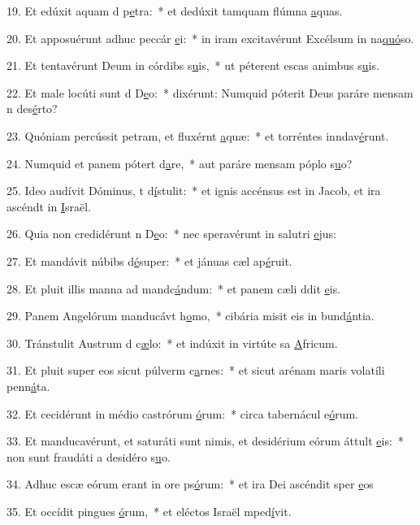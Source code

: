 19. Et edúxit aquam d p\uline{e}tra:~* et dedúxit tamquam flúmna \uline{a}quas.\par 
20. Et apposuérunt adhuc peccár \uline{e}i:~* in iram excitavérunt Excélsum in na\uline{quó}so.\par 
21. Et tentavérunt Deum in córdibs s\uline{u}is,~* ut péterent escas animbus s\uline{u}is.\par 
22. Et male locúti sunt d D\uline{e}o:~* dixérunt: Numquid póterit Deus paráre mensam n des\uline{é}rto?\par 
23. Quóniam percússit petram, et fluxérnt \uline{a}quæ:~* et torréntes inndav\uline{é}runt.\par 
24. Numquid et panem pótert d\uline{a}re,~* aut paráre mensam póplo s\uline{u}o?\par 
25. Ideo audívit Dóminus, t d\uline{í}stulit:~* et ignis accénsus est in Jacob, et ira ascéndt in \uline{I}sraël.\par 
26. Quia non credidérunt n D\uline{e}o:~* nec speravérunt in salutri \uline{e}jus:\par 
27. Et mandávit núbibs d\uline{é}super:~* et jánuas cæl ap\uline{é}ruit.\par 
28. Et pluit illis manna ad mandc\uline{á}ndum:~* et panem cæli ddit \uline{e}is.\par 
29. Panem Angelórum manducávt h\uline{o}mo,~* cibária misit eis in bund\uline{á}ntia.\par 
30. Tránstulit Austrum d c\uline{æ}lo:~* et indúxit in virtúte sa \uline{A}fricum.\par 
31. Et pluit super eos sicut púlverm c\uline{a}rnes:~* et sicut arénam maris volatíli penn\uline{á}ta.\par 
32. Et cecidérunt in médio castrórum \uline{ó}rum:~* circa tabernácul e\uline{ó}rum.\par 
33. Et manducavérunt, et saturáti sunt nimis, et desidérium eórum áttult \uline{e}is:~* non sunt fraudáti a desidéro s\uline{u}o.\par 
34. Adhuc escæ eórum erant in ore ps\uline{ó}rum:~* et ira Dei ascéndit sper \uline{e}os\par 
35. Et occídit pingues \uline{ó}rum,~* et eléctos Israël mped\uline{í}vit.\par 
